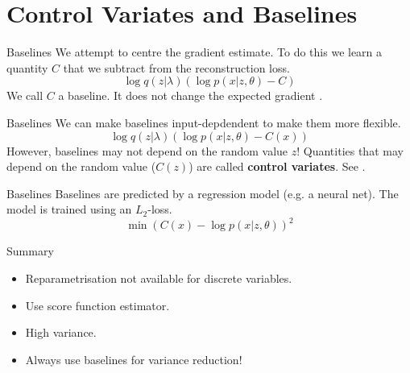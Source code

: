 \documentclass[14pt]{beamer}
\begin{document}
\section{Control Variates and Baselines}

\begin{frame}
\tableofcontents[currentsection]
\end{frame}

\begin{frame}{Baselines}
We attempt to centre the gradient estimate. To do this we learn a quantity $ C $ that we subtract
from the reconstruction loss.
\begin{equation*}
\log q(z|\lambda) \left( \log p(x|z,\theta) - C \right)
\end{equation*}
We call $ C $ a baseline. It does not change the expected gradient \citep{Williams:1992}.
\end{frame}

\begin{frame}{Baselines}
We can make baselines input-depdendent to make them more flexible.
\begin{equation*}
\log q(z|\lambda) \left( \log p(x|z,\theta) - C(x) \right)
\end{equation*}
However, baselines may not depend on the random value $ z $! Quantities that may depend on the
random value ($ C(z) $) are called \textbf{control variates}. See \cite{PaisleyEtAl:2012, RanganathEtAl:2014,GregorEtAl:2014}.
\end{frame}

\begin{frame}{Baselines}
Baselines are predicted by a regression model (e.g. a neural net). The model is trained using 
an $ L_{2} $-loss.
\begin{equation*}
\min \left(C(x) - \log p(x|z,\theta)\right)^{2}
\end{equation*}
\end{frame}

\begin{frame}{Summary}
\begin{itemize}
\pause
\item Reparametrisation not available for discrete variables.
\pause
\item Use score function estimator.
\pause
\item High variance.
\pause
\item Always use baselines for variance reduction!
\end{itemize}
\end{frame}

\begin{frame}[allowframebreaks]


\end{frame}
\end{document}

